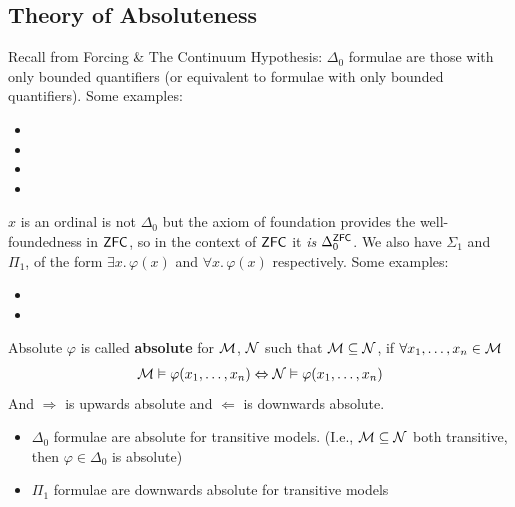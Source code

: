 \documentclass{article}
\begin{document}
\subsection{Theory of Absoluteness}
Recall from Forcing \& The Continuum Hypothesis: $\Delta_{0}$ formulae are those with only bounded quantifiers (or equivalent to formulae with only bounded quantifiers). Some examples: \begin{itemize}
    \item {}
    \item {}
    \item {}
    \item {}
\end{itemize}
$x$ is an ordinal is not $\Delta_{0}$ but the axiom of foundation provides the well-foundedness in $\mathsf{ZFC}$, so in the context of $\mathsf{ZFC}$ it \textit{is} $\Delta_{0}^{\mathsf{ZFC}}$. \gap 
We also have $\Sigma_{1}$ and $\Pi_{1}$, of the form $\exists x. \, \varphi(x)$ and $\forall x.\, \varphi(x)$ respectively. Some examples: \begin{itemize}
    \item {}
    \item {}
\end{itemize}
\begin{fancydefine}{Absolute}
    $\varphi$ is called \textbf{absolute} for $\mathcal{M}$, $\mathcal{N}$ such that $\mathcal{M} \subseteq \mathcal{N}$, if $\forall x_{1}, \dots, x_{n} \in \mathcal{M}$ \begin{align*}
        \mathcal{M} \vDash \varphi(x_{1}, \dots, x_{n}) \Leftrightarrow \mathcal{N} \vDash \varphi(x_{1}, \dots, x_{n})
    \end{align*}
    And $\Rightarrow$ is upwards absolute and $\Leftarrow$ is downwards absolute.
\end{fancydefine}
\begin{fancythm}{}
    \begin{itemize}
        \item $\Delta_{0}$ formulae are absolute for transitive models. (I.e., $\mathcal{M} \subseteq \mathcal{N}$ both transitive, then $\varphi \in \Delta_{0}$ is absolute)
        \item $\Pi_{1}$ formulae are downwards absolute for transitive models
    \end{itemize}
\end{fancythm}
\end{document}
